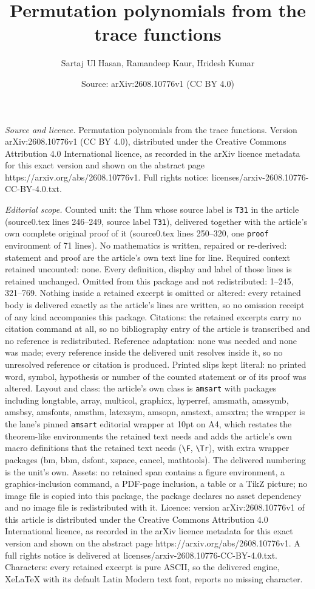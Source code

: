 \documentclass[10pt,a4paper]{amsart}
\title[Permutation polynomials from the trace functions]{Permutation polynomials from the trace functions}
\author{Sartaj Ul Hasan, Ramandeep Kaur, Hridesh Kumar}
\date{Source: arXiv:2608.10776v1 (CC BY 4.0)}
\begin{document}
\maketitle

\noindent\emph{Source and licence.} Permutation polynomials from the trace functions. Version arXiv:2608.10776v1 (CC BY 4.0), distributed under the Creative Commons Attribution 4.0 International licence, as recorded in the arXiv licence metadata for this exact version and shown on the abstract page https://arxiv.org/abs/2608.10776v1. Full rights notice: licenses/arxiv-2608.10776-CC-BY-4.0.txt.\par\smallskip

\noindent\textit{Editorial scope.} Counted unit: the Thm whose source label is \texttt{T31} in the article (source0.tex lines 246--249, source label \texttt{T31}), delivered together with the article's own complete original proof of it (source0.tex lines 250--320, one \texttt{proof} environment of 71 lines). No mathematics is written, repaired or re-derived: statement and proof are the article's own text line for line. Required context retained uncounted: none. Every definition, display and label of those lines is retained unchanged. Omitted from this package and not redistributed: 1--245, 321--769. Nothing inside a retained excerpt is omitted or altered: every retained body is delivered exactly as the article's lines are written, so no omission receipt of any kind accompanies this package. Citations: the retained excerpts carry no citation command at all, so no bibliography entry of the article is transcribed and no reference is redistributed. Reference adaptation: none was needed and none was made; every reference inside the delivered unit resolves inside it, so no unresolved reference or citation is produced. Printed slips kept literal: no printed word, symbol, hypothesis or number of the counted statement or of its proof was altered. Layout and class: the article's own class is \texttt{amsart} with packages including longtable, array, multicol, graphicx, hyperref, amsmath, amssymb, amsbsy, amsfonts, amsthm, latexsym, amsopn, amstext, amsxtra; the wrapper is the lane's pinned \texttt{amsart} editorial wrapper at 10pt on A4, which restates the theorem-like environments the retained text needs and adds the article's own macro definitions that the retained text needs (\texttt{\textbackslash F}, \texttt{\textbackslash Tr}), with extra wrapper packages (bm, bbm, dsfont, xspace, cancel, mathtools). The delivered numbering is the unit's own. Assets: no retained span contains a figure environment, a graphics-inclusion command, a PDF-page inclusion, a table or a TikZ picture; no image file is copied into this package, the package declares no asset dependency and no image file is redistributed with it. Licence: version arXiv:2608.10776v1 of this article is distributed under the Creative Commons Attribution 4.0 International licence, as recorded in the arXiv licence metadata for this exact version and shown on the abstract page https://arxiv.org/abs/2608.10776v1. A full rights notice is delivered at licenses/arxiv-2608.10776-CC-BY-4.0.txt. Characters: every retained excerpt is pure ASCII, so the delivered engine, XeLaTeX with its default Latin Modern text font, reports no missing character.
\end{document}
